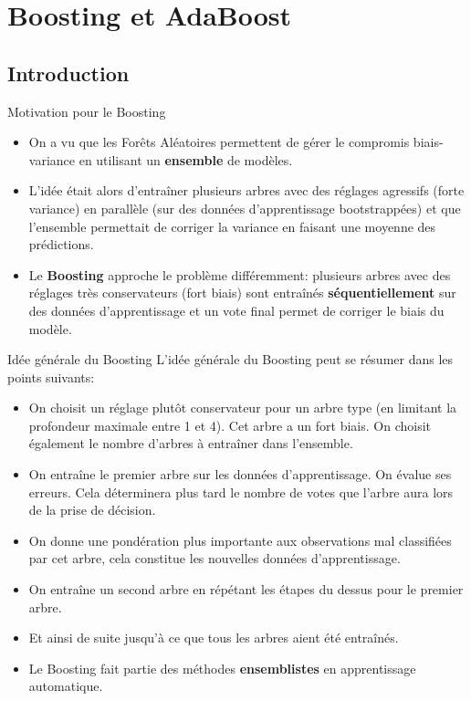 \section[Boosting et AdaBoost]{Boosting et AdaBoost}

\subsection[Introduction]{Introduction}

\begin{frame}{Motivation pour le Boosting}
	\begin{itemize}
		\item On a vu que les Forêts Aléatoires permettent de gérer le compromis biais-variance en utilisant un \textbf{ensemble} de modèles.
		\item L'idée était alors d'entraîner plusieurs arbres avec des réglages agressifs (forte variance) en parallèle (sur des données d'apprentissage bootstrappées) et que l'ensemble permettait de corriger la variance en faisant une moyenne des prédictions.
		\item Le \textbf{Boosting} approche le problème différemment: plusieurs arbres avec des réglages très conservateurs (fort biais) sont entraînés \textbf{séquentiellement} sur des données d'apprentissage et un vote final permet de corriger le biais du modèle.
	\end{itemize}
\end{frame}

\begin{frame}{Idée générale du Boosting}
	L'idée générale du Boosting peut se résumer dans les points suivants:
	\begin{itemize}
		\item On choisit un réglage plutôt conservateur pour un arbre type (en limitant la profondeur maximale entre 1 et 4). Cet arbre a un fort biais. On choisit également le nombre d'arbres à entraîner dans l'ensemble.
		\pause
		\item On entraîne le premier arbre sur les données d'apprentissage. On évalue ses erreurs. Cela déterminera plus tard le nombre de votes que l'arbre aura lors de la prise de décision.
		\pause
		\item On donne une pondération plus importante aux observations mal classifiées par cet arbre, cela constitue les nouvelles données d'apprentissage.
		\pause
		\item On entraîne un second arbre en répétant les étapes du dessus pour le premier arbre.
		\pause
		\item Et ainsi de suite jusqu'à ce que tous les arbres aient été entraînés.
		\pause
		\item Le Boosting fait partie des méthodes \textbf{ensemblistes} en apprentissage automatique.
	\end{itemize}
\end{frame}

